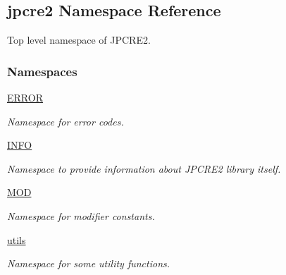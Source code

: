 \hypertarget{namespacejpcre2}{}\subsection{jpcre2 Namespace Reference}
\label{namespacejpcre2}


Top level namespace of J\+P\+C\+R\+E2.  


\subsubsection*{Namespaces}
\begin{DoxyCompactItemize}
\item 
 \hyperlink{namespacejpcre2_1_1ERROR}{E\+R\+R\+OR}
\begin{DoxyCompactList}\small\item\em Namespace for error codes. \end{DoxyCompactList}\item 
 \hyperlink{namespacejpcre2_1_1INFO}{I\+N\+FO}
\begin{DoxyCompactList}\small\item\em Namespace to provide information about J\+P\+C\+R\+E2 library itself. \end{DoxyCompactList}\item 
 \hyperlink{namespacejpcre2_1_1MOD}{M\+OD}
\begin{DoxyCompactList}\small\item\em Namespace for modifier constants. \end{DoxyCompactList}\item 
 \hyperlink{namespacejpcre2_1_1utils}{utils}
\begin{DoxyCompactList}\small\item\em Namespace for some utility functions. \end{DoxyCompactList}\end{DoxyCompactItemize}
